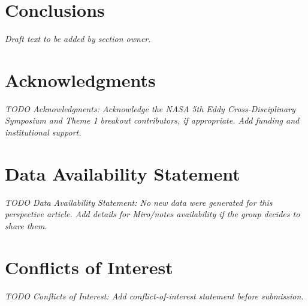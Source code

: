 \documentclass[
  draft
]{agujournal2025}
\begin{document}
\section{Conclusions}

\noindent\textit{Draft text to be added by section owner.}

\section*{Acknowledgments}
\textit{TODO Acknowledgments: Acknowledge the NASA 5th Eddy Cross-Disciplinary Symposium and Theme 1 breakout contributors, if appropriate. Add funding and institutional support.}

\section*{Data Availability Statement}
\textit{TODO Data Availability Statement: No new data were generated for this perspective article. Add details for Miro/notes availability if the group decides to share them.}

\section*{Conflicts of Interest}
\textit{TODO Conflicts of Interest: Add conflict-of-interest statement before submission.}


\end{document}
